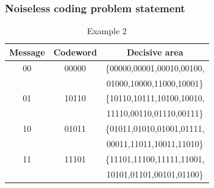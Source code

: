 \documentclass[14pt]{beamer}
\begin{document}
\begin{frame}
\frametitle{Noiseless coding problem statement}



    \begin{table}[htbp]
    \begin{center}
    \caption{Example 2}
    \begin{tabular}
        {|c|c|c|} \hline %
        Message & Codeword & Decisive area \\ \hline %
        00& 00000& \{00000,00001,00010,00100,  \\
          &      &   01000,10000,11000,10001\} \\  \hline %
        01& 10110& \{10110,10111,10100,10010, \\
          &      &   11110,00110,01110,00111\} \\  \hline %
        10& 01011& \{01011,01010,01001,01111,  \\
          &      &   00011,11011,10011,11010\} \\  \hline %
        11& 11101& \{11101,11100,11111,11001,  \\
          &      &   10101,01101,00101,01100\} \\ \hline %
    \end{tabular}
    \end{center}
    \end{table}

\end{frame}
\end{document}
